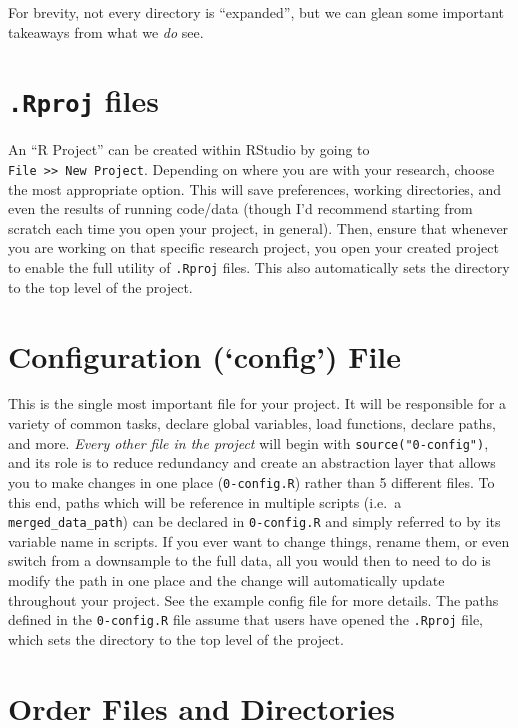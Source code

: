 \documentclass[]{book}
\begin{document}
For brevity, not every directory is ``expanded'', but we can glean some important takeaways from what we \emph{do} see.

\hypertarget{rproj-files}{%
\section{\texorpdfstring{\texttt{.Rproj} files}{.Rproj files}}\label{rproj-files}}

An ``R Project'' can be created within RStudio by going to \texttt{File\ \textgreater{}\textgreater{}\ New\ Project}. Depending on where you are with your research, choose the most appropriate option. This will save preferences, working directories, and even the results of running code/data (though I'd recommend starting from scratch each time you open your project, in general). Then, ensure that whenever you are working on that specific research project, you open your created project to enable the full utility of \texttt{.Rproj} files. This also automatically sets the directory to the top level of the project.

\hypertarget{configuration-config-file}{%
\section{Configuration (`config') File}\label{configuration-config-file}}

This is the single most important file for your project. It will be responsible for a variety of common tasks, declare global variables, load functions, declare paths, and more. \emph{Every other file in the project} will begin with \texttt{source("0-config")}, and its role is to reduce redundancy and create an abstraction layer that allows you to make changes in one place (\texttt{0-config.R}) rather than 5 different files. To this end, paths which will be reference in multiple scripts (i.e.~a \texttt{merged\_data\_path}) can be declared in \texttt{0-config.R} and simply referred to by its variable name in scripts. If you ever want to change things, rename them, or even switch from a downsample to the full data, all you would then to need to do is modify the path in one place and the change will automatically update throughout your project. See the example config file for more details. The paths defined in the \texttt{0-config.R} file assume that users have opened the \texttt{.Rproj} file, which sets the directory to the top level of the project.

\hypertarget{order-files-and-directories}{%
\section{Order Files and Directories}\label{order-files-and-directories}}
\end{document}
